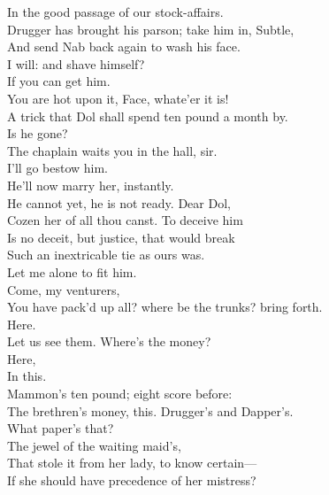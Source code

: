 \documentclass[a4paper,oneside]{memoir}
\begin{document}
\begin{drama*}
In the good passage of our stock-affairs.\\
\facespeaks Drugger has brought his parson; take him in, Subtle,\\
And send Nab back again to wash his face.\\
\subtlespeaks I will: and shave himself?\\
\facespeaks {} If you can get him.\\
\dolspeaks You are hot upon it, Face, whate'er it is!\\
\facespeaks A trick that Dol shall spend ten pound a month by.\\
Is he gone?\\
\subtlespeaks {} The chaplain waits you in the hall, sir.\\
\facespeaks I'll go bestow him.\\
\dolspeaks {} He'll now marry her, instantly.\\
\subtlespeaks He cannot yet, he is not ready. Dear Dol,\\
Cozen her of all thou canst. To deceive him\\
Is no deceit, but justice, that would break\\
Such an inextricable tie as ours was.\\
\dolspeaks Let me alone to fit him.\\
\facespeaks {} Come, my venturers,\\
You have pack'd up all? where be the trunks? bring forth.\\
\subtlespeaks Here.\\
\facespeaks {} Let us see them. Where's the money?\\
\subtlespeaks {} Here,\\
In this.\\
\facespeaks {} Mammon's ten pound; eight score before:\\
The brethren's money, this. Drugger's and Dapper's.\\
What paper's that?\\
\dolspeaks {} The jewel of the waiting maid's,\\
That stole it from her lady, to know certain---\\
\facespeaks If she should have precedence of her mistress?\\

\end{drama*}
\end{document}
